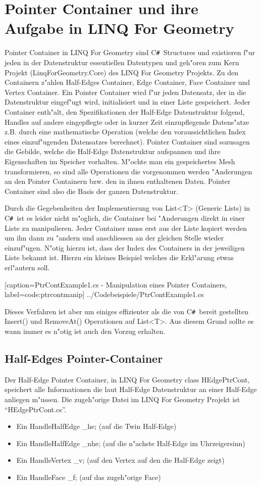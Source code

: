 \documentclass[pagesize, paper=a4, fontsize=12pt,titlepage=true, headings=small, headnosepline, abstractoff, liststotoc, nochapterprefix, plainheadsepline]{scrreprt}
\newcommand{\CSS}{C\texttt{\# }}
\newcommand{\LFG}{LINQ For Geometry}
\newcommand{\LFGS}{LINQ For Geometry }
\newcommand{\HES}{Half-Edge Datenstruktur }
\begin{document}
\section {Pointer Container und ihre Aufgabe in \LFG}
		Pointer Container in \LFGS sind \CSS Structures und existieren f"ur jeden in der Datenstruktur essentiellen Datentypen und geh"oren zum Kern Projekt (LinqForGeometry.Core) des \LFGS Projekts. Zu den Containern z"ahlen Half-Edges Container, Edge Container, Face Container und Vertex Container. Ein Pointer Container wird f"ur jeden Datensatz, der in die Datenstruktur eingef"ugt wird, initialisiert und in einer Liste gespeichert. Jeder Container enth"alt, den Spezifikationen der \HES folgend, Handles auf andere eingepflegte oder in kurzer Zeit einzupflegende Datens"atze z.B. durch eine mathematische Operation (welche den voraussichtlichen Index eines einzuf"ugenden Datensatzes berechnet). Pointer Container sind sozusagen die Gebilde, welche die Half-Edge Datenstruktur aufspannen und ihre Eigenschaften im Speicher vorhalten. M"ochte man ein gespeichertes Mesh transformieren, so sind alle Operationen die vorgenommen werden "Anderungen an den Pointer Containern bzw. den in ihnen enthaltenen Daten. Pointer Container sind also die Basis der ganzen Datenstruktur.
\newline

Durch die Gegebenheiten der Implementierung von List<T> (Generic Lists) in \CSS ist es leider nicht m"oglich, die Container bei "Anderungen direkt in einer Liste zu manipulieren. Jeder Container muss erst aus der Liste kopiert werden um ihn dann zu "andern und anschliessen an der gleichen Stelle wieder einzuf"ugen. N"otig hierzu ist, dass der Index des Containers in der jeweiligen Liste bekannt ist. Hierzu ein kleines Beispiel welches die Erkl"arung etwas erl"autern soll.
\newpage

			[caption={PtrContExample1.cs - Manipulation eines Pointer Containers}, label=code:ptrcontmanip]
			{../Codebeispiele/PtrContExample1.cs}

Dieses Verfahren ist aber um einiges effizienter als die von \CSS bereit gestellten Insert() und RemoveAt() Operationen auf List<T>. Aus diesem Grund sollte es wann immer es n"otig ist auch den Vorzug erhalten.
\subsection {Half-Edges Pointer-Container}
			Der Half-Edge Pointer Container, in \LFGS class HEdgePtrCont, speichert alle Informationen die laut \HES an einer Half-Edge anliegen m"ussen. Die zugeh"orige Datei im \LFGS Projekt ist "`HEdgePtrCont.cs"'.
\begin{itemize}
\item Ein HandleHalfEdge \_he; (auf die Twin Half-Edge)
\item Ein HandleHalfEdge \_nhe; (auf die n"achste Half-Edge im Uhrzeigersinn)
\item Ein HandleVertex \_v; (auf den Vertex auf den die Half-Edge zeigt)
\item Ein HandleFace \_f; (auf das zugeh"orige Face)
\end{itemize}
\end{document}
